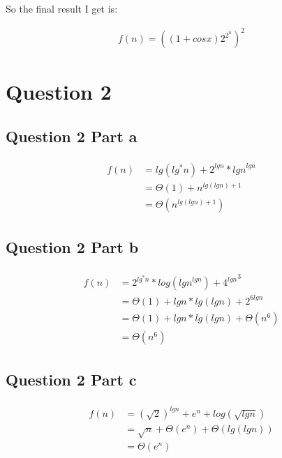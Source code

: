 \documentclass[paper=a4, fontsize=11pt]{scrartcl} %
\numberwithin{equation}{section} %
\numberwithin{figure}{section} %
\numberwithin{table}{section} %
\begin{document}
So the final result I get is:

\begin{equation*}
\begin{split}
f(n)=\left({(1+cosx)} 2^{2^n}\right)^2
\end{split}					
\end{equation*}
\vspace{2cm}
\section{Question 2}
\subsection{Question 2 Part a}
\begin{align*}
\begin{split}
f(n) &=lg(lg^*n)+2^{lgn}*{lgn}^{lgn}\\
 &=\Theta(1)+n^{lg(lgn)+1}\\
 &=\Theta(n^{lg(lgn)+1})
\end{split}
\end{align*}

\subsection{Question 2 Part b}
\begin{align*}
\begin{split}
f(n) &=2^{lg^* n}*log({lgn}^{lgn})+{4^{lgn}}^3\\
&=\Theta(1)+lgn*lg(lgn)+2^{6lgn}\\
&=\Theta(1)+lgn*lg(lgn)+\Theta(n^6)\\
&=\Theta(n^6)
\end{split}
\end{align*}

\subsection{Question 2 Part c}
\begin{align*}
\begin{split}
f(n) &={(\sqrt 2)}^{lgn}+e^n+log(\sqrt {lgn})\\
&=\sqrt n+\Theta(e^n)+\Theta(lg(lgn))\\
&=\Theta(e^n)
\end{split}
\end{align*}
\end{document}
